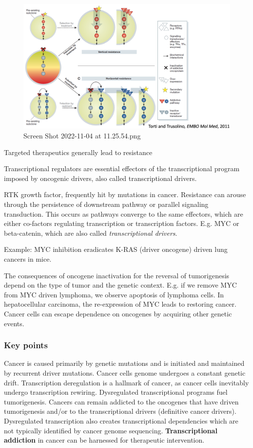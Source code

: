 \begin{figure}
\centering
\includegraphics{../_resources/Screen_Shot_2022-11-04_at_11-25-54.png}
\caption{Screen Shot 2022-11-04 at 11.25.54.png}
\end{figure}

 Targeted therapeutics generally lead to resistance

Transcriptional regulators are essential effectors of the transcriptional program imposed by oncogenic drivers, also called transcriptional drivers.

RTK growth factor, frequently hit by mutations in cancer. Resistance can arouse through the persistence of downstream pathway or parallel signaling transduction. This occurs as pathways converge to the same effectors, which are either co-factors regulating transcription or transcription factors. E.g. MYC or beta-catenin, which are also called \emph{transcriptional drivers}.

Example: MYC inhibition eradicates K-RAS (driver oncogene) driven lung cancers in mice.

The consequences of oncogene inactivation for the reversal of tumorigenesis depend on the type of tumor and the genetic context. E.g. if we remove MYC from MYC driven lymphoma, we observe apoptosis of lymphoma cells. In hepatocellular carcinoma, the re-expression of MYC leads to restoring cancer. Cancer cells can escape dependence on oncogenes by acquiring other genetic events.

\hypertarget{key-points}{%
\subsubsection{Key points}\label{key-points}}

Cancer is caused primarily by genetic mutations and is initiated and maintained by recurrent driver mutations. Cancer cells genome undergoes a constant genetic drift. Transcription deregulation is a hallmark of cancer, as cancer cells inevitably undergo transcription rewiring. Dysregulated transcriptional programs fuel tumorigenesis. Cancers can remain addicted to the oncogenes that have driven tumorigenesis and/or to the transcriptional drivers (definitive cancer drivers). Dysregulated transcription also creates transcriptional dependencies which are not typically identified by cancer genome sequencing. \textbf{Transcriptional addiction} in cancer can be harnessed for therapeutic intervention.

